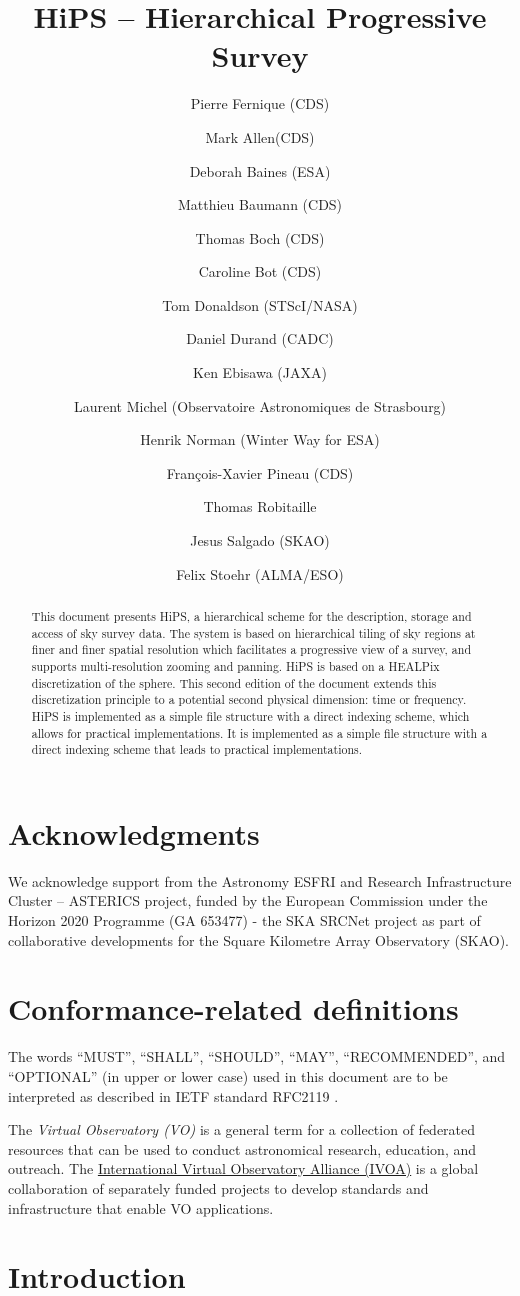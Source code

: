 \documentclass[11pt,a4paper]{ivoa}
\title{HiPS -- Hierarchical Progressive Survey}
\author{Pierre Fernique (CDS)}
\author{Mark Allen(CDS)}
\author{Deborah Baines (ESA)}
\author{Matthieu Baumann (CDS)}
\author{Thomas Boch (CDS)}
\author{Caroline Bot (CDS)}
\author{Tom Donaldson (STScI/NASA)}
\author{Daniel Durand (CADC)}
\author{Ken Ebisawa (JAXA)}
\author{Laurent Michel (Observatoire Astronomiques de Strasbourg)}
\author{Henrik Norman (Winter Way for ESA)}
\author{François-Xavier Pineau (CDS)}
\author{Thomas Robitaille}
\author{Jesus Salgado (SKAO)}
\author{Felix Stoehr (ALMA/ESO)}
\begin{document}
\begin{abstract}
This document presents HiPS, a hierarchical scheme for the description, storage and access of sky survey data. The system is based on hierarchical tiling of sky regions at finer and finer spatial resolution which facilitates a progressive view of a survey, and supports multi-resolution zooming and panning. HiPS is based on a HEALPix discretization of the sphere. This second edition of the document extends this discretization principle to a potential second physical dimension: time or frequency. HiPS is implemented as a simple file structure with a direct indexing scheme, which allows for practical implementations. It is implemented as a simple file structure with a direct indexing scheme that leads to practical implementations.
\end{abstract}

\listoffigures
\listoftables  

\section*{Acknowledgments}
We acknowledge support from the Astronomy ESFRI and Research Infrastructure Cluster – ASTERICS project, funded by the European Commission under the Horizon 2020 Programme (GA 653477) - the SKA SRCNet project as part of collaborative developments for the Square Kilometre Array Observatory (SKAO).

\section*{Conformance-related definitions}

The words ``MUST'', ``SHALL'', ``SHOULD'', ``MAY'', ``RECOMMENDED'', and
``OPTIONAL'' (in upper or lower case) used in this document are to be
interpreted as described in IETF standard RFC2119 \citep{std:RFC2119}.

The \emph{Virtual Observatory (VO)} is a
general term for a collection of federated resources that can be used
to conduct astronomical research, education, and outreach.
The \href{https://www.ivoa.net}{International
Virtual Observatory Alliance (IVOA)} is a global
collaboration of separately funded projects to develop standards and
infrastructure that enable VO applications.

\section{Introduction}
\end{document}
